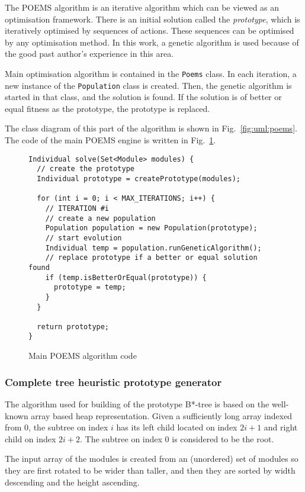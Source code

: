 The POEMS algorithm is an iterative algorithm which can be viewed as an optimisation framework. There is an initial solution called the {\em prototype}, which is iteratively optimised by sequences of actions. These sequences can be optimised by any optimisation method. In this work, a genetic algorithm is used because of the good past author's experience in this area. 

Main optimisation algorithm is contained in the {\tt Poems} class. In each iteration, a new instance of the {\tt Population} class is created. Then, the genetic algorithm is started in that class, and the solution is found. If the solution is of better or equal fitness as the prototype, the prototype is replaced.

The class diagram of this part of the algorithm is shown in Fig.~\ref{fig:uml:poems}. The code of the main POEMS engine is written in Fig.~\ref{alg:poems}.

\begin{figure}
\centering
\begin{lstlisting}
Individual solve(Set<Module> modules) {
  // create the prototype
  Individual prototype = createPrototype(modules);
  
  for (int i = 0; i < MAX_ITERATIONS; i++) {
    // ITERATION #i
    // create a new population
    Population population = new Population(prototype);
    // start evolution
    Individual temp = population.runGeneticAlgorithm();
    // replace prototype if a better or equal solution found
    if (temp.isBetterOrEqual(prototype)) {
      prototype = temp;
    }
  }
  
  return prototype;
}
\end{lstlisting}
\caption{Main POEMS algorithm code}
\label{alg:poems}
\end{figure}

\subsubsection{Complete tree heuristic prototype generator}

The algorithm used for building of the prototype B*-tree is based on the well-known array based heap representation. Given a sufficiently long array indexed from $0$, the subtree on index $i$ has its left child located on index $2i+1$ and right child on index $2i+2$. The subtree on index $0$ is considered to be the root. 

The input array of the modules is created from an (unordered) set of modules so they are first rotated to be wider than taller, and then they are sorted by width descending and the height ascending. 

